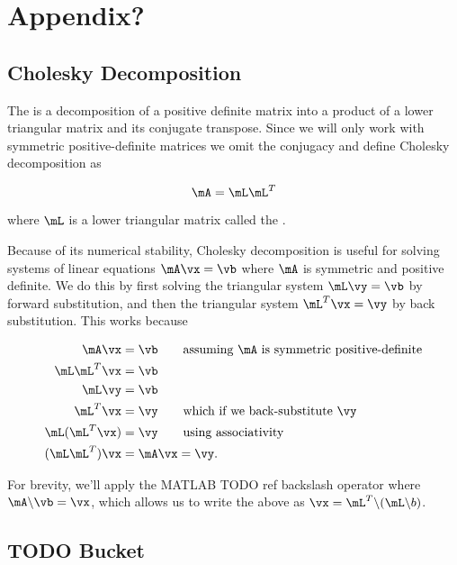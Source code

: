\chapter{Appendix?}

\section{Cholesky Decomposition}

\begin{defn}
  The  is a decomposition of a
  positive definite matrix into a product of a lower triangular matrix and
  its conjugate transpose. Since we will only work with symmetric
  positive-definite matrices we omit the conjugacy and define Cholesky
  decomposition as

  \begin{equation}
    \mA = \mL \mL^T
  \end{equation}

  where $\mL$ is a lower triangular matrix called the .
\end{defn}

Because of its numerical stability, Cholesky decomposition is useful for
solving systems of linear equations $\mA \vx = \vb$ where $\mA$ is symmetric
and positive definite. We do this by first solving the triangular system $\mL
\vy = \vb$ by forward substitution, and then the triangular system $\mL^T \vx =
\vy$ by back substitution. This works because

\begin{align}
  \mA \vx &= \vb \qquad \text{assuming $\mA$ is symmetric positive-definite} \\
  \mL\mL^T \vx &= \vb \\
  \mL \vy &= \vb \\
  \mL^T \vx &= \vy \qquad \text{which if we back-substitute $\vy$} \\
  \mL (\mL^T \vx) &= \vy \qquad \text{using associativity} \\
  (\mL \mL^T) \vx &= \mA \vx = \vy.
\end{align}

For brevity, we'll apply the MATLAB {TODO ref} backslash operator where $\mA
\backslash \vb = \vx$, which allows us to write the above as $\vx = \mL^T
\backslash (\mL \backslash b)$.


\section{TODO Bucket}

